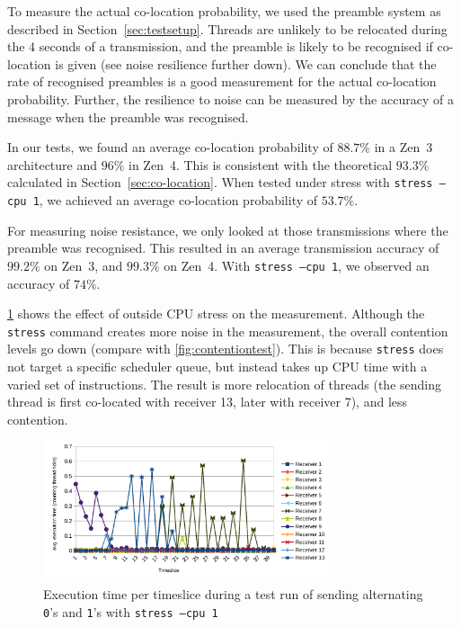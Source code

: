 \documentclass[11pt,
  titlepage=false,
]{scrreprt}
\begin{document}
To measure the actual co-location probability, we used the preamble system as described in Section~\ref{sec:testsetup}.
Threads are unlikely to be relocated during the 4 seconds of a transmission,
and the preamble is likely to be recognised if co-location is given (see noise resilience further down).
We can conclude that the rate of recognised preambles is a good measurement for the actual co-location probability.
Further, the resilience to noise can be measured by the accuracy of a message when the preamble was recognised.

In our tests, we found an average co-location probability of $88.7\%$ in a Zen~3 architecture and $96\%$ in Zen~4.
This is consistent with the theoretical $93.3\%$ calculated in Section~\ref{sec:co-location}.
When tested under stress with \texttt{stress --cpu 1}, we achieved an average co-location probability of $53.7\%$.

For measuring noise resistance, we only looked at those transmissions where the preamble was recognised.
This resulted in an average transmission accuracy of $99.2\%$ on Zen~3, and $99.3\%$ on Zen~4.
With \texttt{stress --cpu 1}, we observed an accuracy of $74\%$.

\ref{fig:contentiontest_stress} shows the effect of outside CPU stress on the measurement.
Although the \texttt{stress} command creates more noise in the measurement, the overall contention levels go down (compare with \ref{fig:contentiontest}).
This is because \texttt{stress} does not target a specific scheduler queue, but instead takes up CPU time with a varied set of instructions.
The result is more relocation of threads (the sending thread is first co-located with receiver 13, later with receiver 7), and less contention.

\begin{figure}
    \centering
    \includegraphics[width=0.75\textwidth]{figures/contentiontest_stress}

    \caption{Execution time per timeslice during a test run of sending alternating \texttt{0}'s and \texttt{1}'s with \texttt{stress --cpu 1}}
    \label{fig:contentiontest_stress}
\end{figure}
\end{document}
